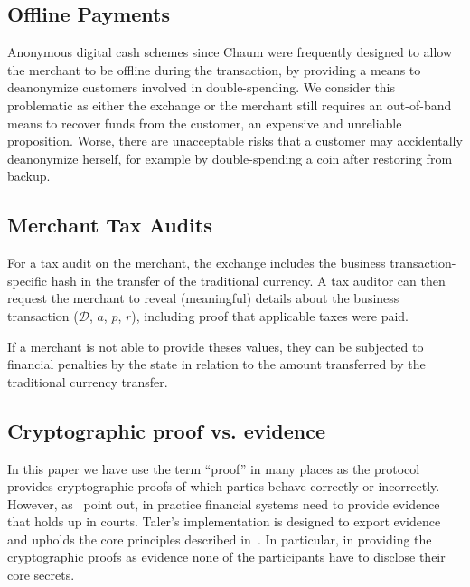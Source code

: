 \documentclass{llncs}
\begin{document}
\subsection{Offline Payments} \label{sec:offline}

Anonymous digital cash schemes since Chaum were frequently designed
to allow the merchant to be offline during the transaction, 
by providing a means to deanonymize customers involved in
double-spending.  We consider this problematic as either the
exchange or the merchant still requires an out-of-band
means to recover funds from the customer, an expensive and
unreliable proposition.  Worse, there are unacceptable risks that
a customer may accidentally deanonymize herself, for example by
double-spending a coin after restoring from backup.

\subsection{Merchant Tax Audits}

For a tax audit on the merchant, the exchange includes the business
transaction-specific hash in the transfer of the traditional
currency.  A tax auditor can then request the merchant to reveal
(meaningful) details about the business transaction ($\mathcal{D}$,
$a$, $p$, $r$), including proof that applicable taxes were paid.

If a merchant is not able to provide theses values, they can be
subjected to financial penalties by the state in relation to the
amount transferred by the traditional currency transfer.

\subsection{Cryptographic proof vs. evidence}

In this paper we have use the term ``proof'' in many places as the
protocol provides cryptographic proofs of which parties behave
correctly or incorrectly. However, as~\cite{fc2014murdoch} point out,
in practice financial systems need to provide evidence that holds up
in courts.  Taler's implementation is designed to export evidence and
upholds the core principles described in~\cite{fc2014murdoch}.  In
particular, in providing the cryptographic proofs as evidence none of
the participants have to disclose their core secrets.


%
\end{document}
